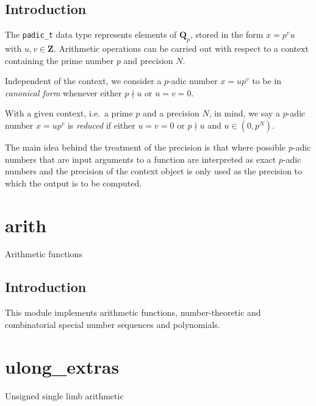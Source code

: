 \documentclass[a4paper,10pt]{book}
\newcommand{\code}{\lstinline}
\begin{document}
\section{Introduction}

The \code{padic_t} data type represents elements of $\mathbf{Q}_p$, 
stored in the form $x = p^v u$ with $u, v \in \mathbf{Z}$.  Arithmetic 
operations can be carried out with respect to a context containing 
the prime number $p$ and precision $N$.

Independent of the context, we consider a $p$-adic number 
$x = u p^v$ to be in \emph{canonical form} whenever either 
$p \nmid u$ or $u = v = 0$.

With a given context, i.e.\ a prime $p$ and a precision $N$, in 
mind, we say a $p$-adic number $x = u p^v$ is \emph{reduced} if 
either $u = v = 0$ or $p \nmid u$ and $u \in (0, p^N)$.

The main idea behind the treatment of the precision is that 
where possible $p$-adic numbers that are input arguments to 
a function are interpreted as exact $p$-adic numbers and the 
precision of the context object is only used as the precision 
to which the output is to be computed.




\chapter{arith}
\epigraph{Arithmetic functions}{}

\section{Introduction}

This module implements arithmetic functions, number-theoretic and 
combinatorial special number sequences and polynomials.




\chapter{ulong\_extras}
\epigraph{Unsigned single limb arithmetic}{}
\end{document}
